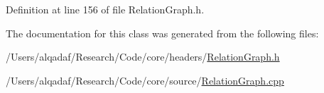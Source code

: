 Definition at line 156 of file RelationGraph.h.



The documentation for this class was generated from the following files:\begin{DoxyCompactItemize}
\item 
/Users/alqadaf/Research/Code/core/headers/\hyperlink{_relation_graph_8h}{RelationGraph.h}\item 
/Users/alqadaf/Research/Code/core/source/\hyperlink{_relation_graph_8cpp}{RelationGraph.cpp}\end{DoxyCompactItemize}
